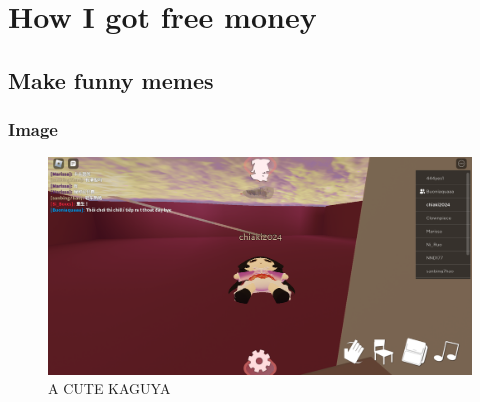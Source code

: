 \chapter{How I got free money}
\section{Make funny memes}
\subsection{Image}
\begin{figure}[ht]
\centering
\includegraphics[width=1\textwidth]{pantsu.png}
\caption{A CUTE KAGUYA}
\end{figure}